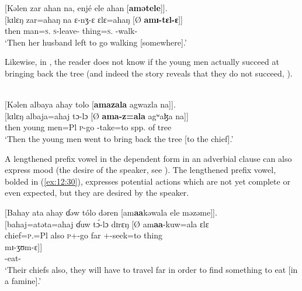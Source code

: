 \ea \label{ex:12:28}
{}[Kəlen  zar  ahan  na,  enjé  ele  ahan  [\textbf{amətele}]].\\
\gll  {}[kɪlɛŋ  zar=ahaŋ    na  ɛ{}-nʒ-ɛ    ɛlɛ=ahaŋ      [Ø \textbf{amɪ-tɛl-ɛ}]]\\
      then    man=\textsc{s}.{\POSS}  {\PSP}  \textsc{s}-leave-{\CL}  thing=\textsc{s}.{\POSS} {} {\DEP}-walk-{\CL}\\
\glt  ‘Then her husband left to go walking [somewhere].’ 
\z 

Likewise, in , the reader does not know if the young men actually succeed at bringing back the tree (and indeed the story reveals that they do not succeed, ).

\ea \label{ex:12:29}
\\
{}[Kəlen  albaya  ahay  tolo  [\textbf{amazala}  agwazla  na]].\\
\gll  {}[kɪlɛŋ  albaja=ahaj  tɔ-lɔ  [Ø \textbf{ama-z=ala}  agʷaɮa    na]]\\
      then    {young men}=Pl  \textsc{p}-go   {}  {\DEP}-take=to  {spp. of tree}  {\PSP}\\
\glt  ‘Then the young men went to bring back the tree [to the chief].’
\z 

A lengthened prefix vowel in the dependent form in an adverbial clause can also express mood (the desire of the speaker, see ). The lengthened prefix vowel, bolded in (\ref{ex:12:30}), expresses potential actions which are not yet complete or even expected, but they are desired by the speaker.

\clearpage
\ea \label{ex:12:30}
{}[Bahay  ata  ahay  ɗəw  tólo  dəren  [am\textbf{aa}kəwala  ele  məzəme]].\\
\gll  {}[bahaj=atəta=ahaj  ɗuw  t\'{ɔ}-lɔ    dɪrɛŋ      {}[Ø  am\textbf{aa}-kuw=ala ɛlɛ\\  
      chief=\textsc{p}.{\POSS}=Pl  also  \textsc{p}+{\IFV}-go  far    { }  {\DEP}+{\POT}{}-seek=to  thing\\ 
      
      \medskip
\gll mɪ-ʒʊm-ɛ]]\\
     {\NOM}{}-eat-{\CL}\\ 
\glt  ‘Their chiefs also, they will have to travel far in order to find something to eat [in a famine].’ 
\z 

